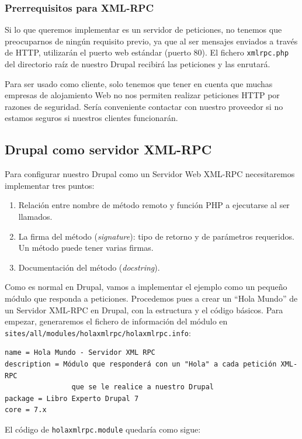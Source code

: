 \subsubsection{Prerrequisitos para XML-RPC}

Si lo que queremos implementar es un servidor de peticiones, no tenemos que preocuparnos de ningún requisito previo, ya 
que al ser mensajes enviados a través de HTTP, utilizarán el puerto web estándar (puerto 80). El fichero \verb|xmlrpc.php| 
del directorio raíz de nuestro Drupal recibirá las peticiones y las enrutará.

Para ser usado como cliente, solo tenemos que tener en cuenta que muchas empresas de alojamiento Web no nos permiten 
realizar peticiones HTTP por razones de seguridad. Sería conveniente contactar con nuestro proveedor si no estamos seguros 
si nuestros clientes funcionarán.

\subsection{Drupal como servidor XML-RPC}

Para configurar nuestro Drupal como un Servidor Web XML-RPC necesitaremos implementar tres puntos:

\begin{enumerate}
  \item Relación entre nombre de método remoto y función PHP a ejecutarse al ser llamados.
  \item La firma del método (\textit{signature}): tipo de retorno y de parámetros requeridos. Un método puede tener varias firmas.
  \item Documentación del método (\textit{docstring}).
\end{enumerate}

Como es normal en Drupal, vamos a implementar el ejemplo como un pequeño módulo que responda a peticiones. Procedemos pues a 
crear un ``Hola Mundo'' de un Servidor XML-RPC en Drupal, con la estructura y el código básicos. Para empezar, generaremos el 
fichero de información del módulo en \verb|sites/all/modules/holaxmlrpc/holaxmlrpc.info|:

\begin{verbatim}
name = Hola Mundo - Servidor XML RPC
description = Módulo que responderá con un "Hola" a cada petición XML-RPC 
				que se le realice a nuestro Drupal
package = Libro Experto Drupal 7
core = 7.x 
\end{verbatim}

El código de \verb|holaxmlrpc.module| quedaría como sigue:

